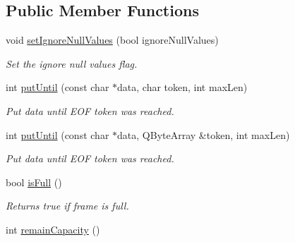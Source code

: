 \subsection*{Public Member Functions}
\begin{DoxyCompactItemize}
\item 
void \hyperlink{classmdt_frame_ac1a8ad77ce7bd6d08032056c3610d5c0}{setIgnoreNullValues} (bool ignoreNullValues)
\begin{DoxyCompactList}\small\item\em Set the ignore null values flag. \end{DoxyCompactList}\item 
int \hyperlink{classmdt_frame_af03d60dadc6bd33b3a333cf484463113}{putUntil} (const char $\ast$data, char token, int maxLen)
\begin{DoxyCompactList}\small\item\em Put data until EOF token was reached. \end{DoxyCompactList}\item 
int \hyperlink{classmdt_frame_aaa5c15df5aaf026b02f34639438036ad}{putUntil} (const char $\ast$data, QByteArray \&token, int maxLen)
\begin{DoxyCompactList}\small\item\em Put data until EOF token was reached. \end{DoxyCompactList}\item 
\hypertarget{classmdt_frame_ab4e0fee7198c94c16f2fa6eb4b6b1562}{
bool \hyperlink{classmdt_frame_ab4e0fee7198c94c16f2fa6eb4b6b1562}{isFull} ()}
\label{classmdt_frame_ab4e0fee7198c94c16f2fa6eb4b6b1562}

\begin{DoxyCompactList}\small\item\em Returns true if frame is full. \end{DoxyCompactList}\item 
\hypertarget{classmdt_frame_aa1cd5c914c36efb3f441b7f6e782dc24}{
int \hyperlink{classmdt_frame_aa1cd5c914c36efb3f441b7f6e782dc24}{remainCapacity} ()}
\label{classmdt_frame_aa1cd5c914c36efb3f441b7f6e782dc24}


\end{DoxyCompactItemize}
